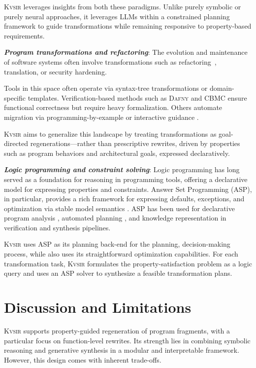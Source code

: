 \documentclass[nonacm,sigplan,review]{acmart}
\newcommand{\sys}{{\scshape Kv{\textalpha}sir}\xspace}
\newcommand{\heading}[1]{\vspace{2pt}\noindent\textbf{\emph{#1}}:\enspace}
\begin{document}
\sys leverages insights from both these paradigms.
Unlike purely symbolic or purely neural approaches, it leverages LLMs within a
constrained planning framework to guide transformations while remaining
responsive to property-based requirements.

\heading{Program transformations and refactoring}
The evolution and maintenance of software systems often involve transformations
such as refactoring~\cite{Fowler99,Mens04,Myers16}, translation, or security hardening. %

Tools in this space often operate via syntax-tree transformations or
domain-specific templates. Verification-based methods such as \textsc{Dafny}
\cite{leino2016dafny} and \textsc{CBMC} \cite{Clarke04} ensure functional correctness
but require heavy formalization.
Others automate migration via
programming-by-example or interactive guidance \cite{gulwani2017program, le2017interactive}.


\sys aims to generalize this landscape by treating transformations as
goal-directed regenerations---rather than prescriptive rewrites, driven by
properties such as program behaviors and architectural goals, expressed declaratively.

\heading{Logic programming and constraint solving}
Logic programming has long served as a foundation for reasoning in programming
tools, offering a declarative model for expressing properties and constraints.
Answer Set Programming (ASP), in particular, provides a rich framework for
expressing defaults, exceptions, and optimization via stable model semantics
\cite{Gelfond_2000, Gelfond_2002, Eiter_2009}. 
ASP has been used for
declarative program analysis \cite{benton2007interactive}, automated planning
\cite{nguyen2020explainable, son2022answersetplanningsurvey}, and knowledge
representation in verification and synthesis pipelines.

\sys uses ASP as its planning back-end for the planning, decision-making
process, while also uses its straightforward optimization capabilities.
For each transformation task, \sys formulates the property-satisfaction problem as a logic query and uses an ASP solver to
synthesize a feasible transformation plans.

\section{Discussion and Limitations}
\label{sec:discussion}

\sys supports property-guided regeneration of program fragments, with a
particular focus on function-level rewrites. Its strength lies in combining
symbolic reasoning and generative synthesis in a modular and interpretable
framework. However, this design comes with inherent trade-offs.
\end{document}
